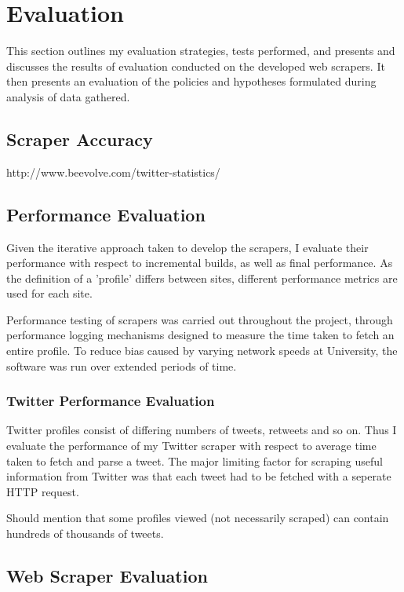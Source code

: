 \chapter{Evaluation}\label{C:us}

This section outlines my evaluation strategies, tests performed, and presents and discusses the results of evaluation conducted on the developed web scrapers. It then presents an evaluation of the policies and hypotheses formulated during analysis of data gathered. 

\section{Scraper Accuracy}

http://www.beevolve.com/twitter-statistics/

\section{Performance Evaluation}

Given the iterative approach taken to develop the scrapers, I evaluate their performance with respect to incremental builds, as well as final performance. As the definition of a 'profile' differs between sites, different performance metrics are used for each site. 

Performance testing of scrapers was carried out throughout the project, through performance logging mechanisms designed to measure the time taken to fetch an entire profile. To reduce bias caused by varying network speeds at University, the software was run over extended periods of time.

\subsection{Twitter Performance Evaluation}

Twitter profiles consist of differing numbers of tweets, retweets and so on. Thus I evaluate the performance of my Twitter scraper with respect to average time taken to fetch and parse a tweet. The major limiting factor for scraping useful information from Twitter was that each tweet had to be fetched with a seperate HTTP request. 

Should mention that some profiles viewed (not necessarily scraped) can contain hundreds of thousands of tweets.


\section{Web Scraper Evaluation}

